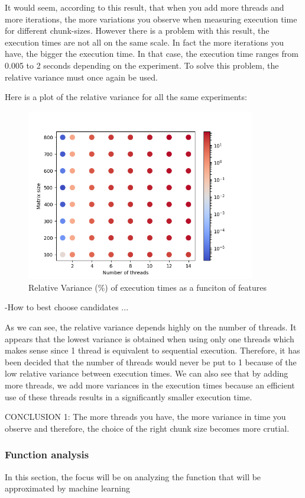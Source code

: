 \documentclass[12pt]{article}
\begin{document}
 It would seem, according to this result, that when you add more threads and more iterations, the more variations you observe when measuring execution time for different chunk-sizes. However there is a problem with this result, the execution times are not all on the same scale. In fact the more iterations you have, the bigger the execution time. In that case, the execution time ranges from 0.005 to 2 seconds depending on the experiment. To solve this problem, the relative variance must once again be used. 

Here is a plot of the relative variance for all the same experiments:

\begin{figure}[H]
	\centering
	\includegraphics[width=100mm]{rel_var_chunk_sizes.png}
	\caption{Relative Variance (\%) of execution times as a funciton of features}
\end{figure}
-How to best choose candidates ...

As we can see, the relative variance depends highly on the number of threads. It appears that the lowest variance is obtained when using only one threads which makes sense since 1 thread is equivalent to sequential execution. Therefore, it has been decided that the number of threads would never be put to 1 because of the low relative variance between execution times. We can also see that by adding more threads, we add more variances in the execution times because an efficient use of these threads results in a significantly smaller execution time.

CONCLUSION 1: The more threads you have, the more variance in time you observe and therefore, the choice of the right chunk size becomes more crutial.
\subsubsection{Function analysis}
In this section, the focus will be on analyzing the function that will be approximated by machine learning
\end{document}
